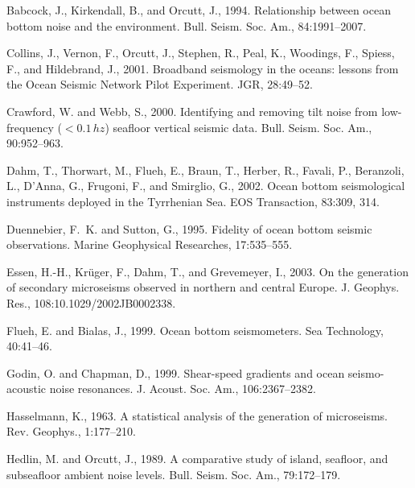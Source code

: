 \documentclass{article}
\begin{document}
{\begin{thebibliography}{}
Babcock, J., Kirkendall, B., and Orcutt, J., 1994.
\newblock Relationship between ocean bottom noise and the environment.
\newblock Bull. Seism. Soc. Am., 84:1991--2007.

Collins, J., Vernon, F., Orcutt, J., Stephen, R., Peal, K., Woodings, F.,
  Spiess, F., and Hildebrand, J., 2001.
\newblock Broadband seismology in the oceans: lessons from the {Ocean Seismic
  Network Pilot Experiment}.
\newblock JGR, 28:49--52.

Crawford, W. and Webb, S., 2000.
\newblock Identifying and removing tilt noise from low-frequency ($< 0.1\, hz$)
  seafloor vertical seismic data.
\newblock Bull. Seism. Soc. Am., 90:952--963.

Dahm, T., Thorwart, M., Flueh, E., Braun, T., Herber, R., Favali, P.,
  Beranzoli, L., D'Anna, G., Frugoni, F., and Smirglio, G., 2002.
\newblock Ocean bottom seismological instruments deployed in the {Tyrrhenian
  Sea}.
\newblock EOS Transaction, 83:309, 314.

Duennebier, F.~K. and Sutton, G., 1995.
\newblock Fidelity of ocean bottom seismic observations.
\newblock Marine Geophysical Researches, 17:535--555.

Essen, H.-H., Kr\"uger, F., Dahm, T., and Grevemeyer, I., 2003.
\newblock On the generation of secondary microseisms observed in northern and
  central {Europe}.
\newblock J. Geophys. Res., 108:10.1029/2002JB0002338.

Flueh, E. and Bialas, J., 1999.
\newblock Ocean bottom seismometers.
\newblock Sea Technology, 40:41--46.

Godin, O. and Chapman, D., 1999.
\newblock Shear-speed gradients and ocean seismo-acoustic noise resonances.
\newblock J. Acoust. Soc. Am., 106:2367--2382.

Hasselmann, K., 1963.
\newblock A statistical analysis of the generation of microseisms.
\newblock Rev. Geophys., 1:177--210.

Hedlin, M. and Orcutt, J., 1989.
\newblock A comparative study of island, seafloor, and subseafloor ambient
  noise levels.
\newblock Bull. Seism. Soc. Am., 79:172--179.


\end{thebibliography}}
\end{document}
